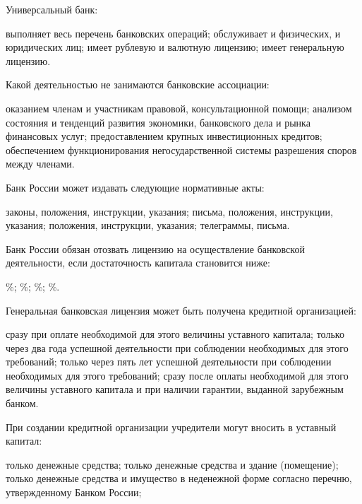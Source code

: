 \documentclass[12pt, table]{exam}
\begin{document}
\begin{questions}
\begin{multicols}{2}
\setlength{\columnsep}{1cm}

\question Универсальный банк:
	 \begin{choices}
	 \CC выполняет весь перечень банковских операций;
	 \choice обслуживает и физических, и юридических лиц;
	 \choice имеет рублевую и валютную лицензию;
	 \choice имеет генеральную лицензию.
	 \end{choices}
\question Какой деятельностью не занимаются банковские ассоциации:
	 \begin{choices}
	 \choice оказанием членам и участникам правовой, консультационной помощи;
	 \choice анализом состояния и тенденций развития экономики, банковского дела и рынка финансовых услуг;
	 \choice предоставлением крупных инвестиционных кредитов;
	 \CC обеспечением функционирования негосударственной системы разрешения споров между членами.
	 \end{choices}
\question Банк России может издавать следующие нормативные акты:
	 \begin{choices}
	 \choice законы, положения, инструкции, указания;
	 \choice письма, положения, инструкции, указания;
	 \choice положения, инструкции, указания;
	 \CC телеграммы, письма.
	 \end{choices}
\question Банк России обязан отозвать лицензию на осуществление банковской деятельности, если достаточность капитала становится ниже:
	 \begin{choices}
	 \%;
	 \%;
	 \%;
	 \%.
	 \end{choices}
\question Генеральная банковская лицензия может быть получена кредитной организацией:
	 \begin{choices}
	 \choice сразу при оплате необходимой для этого величины уставного капитала;
	 \choice только через два года успешной деятельности при соблюдении необходимых для этого требований;
	 \CC только через пять лет успешной деятельности при соблюдении необходимых для этого требований;
	 \choice сразу после оплаты необходимой для этого величины уставного капитала и при наличии гарантии, выданной зарубежным банком.
	 \end{choices}
\question При создании кредитной организации учредители могут вносить в уставный капитал:
	 \begin{choices}
	 \choice только денежные средства;
	 \choice только денежные средства и здание (помещение);
	 \CC только денежные средства и имущество в неденежной форме согласно перечню, утвержденному Банком России;

\end{choices}
\end{multicols}
\end{questions}
\end{document}
